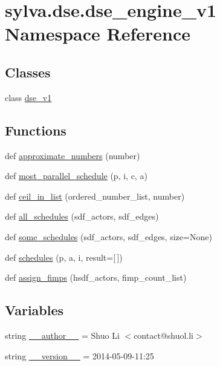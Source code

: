 \hypertarget{namespacesylva_1_1dse_1_1dse__engine__v1}{}\section{sylva.\+dse.\+dse\+\_\+engine\+\_\+v1 Namespace Reference}
\label{namespacesylva_1_1dse_1_1dse__engine__v1}
\subsection*{Classes}
\begin{DoxyCompactItemize}
\item 
class \hyperlink{classsylva_1_1dse_1_1dse__engine__v1_1_1dse__v1}{dse\+\_\+v1}
\end{DoxyCompactItemize}
\subsection*{Functions}
\begin{DoxyCompactItemize}
\item 
def \hyperlink{namespacesylva_1_1dse_1_1dse__engine__v1_ad6e97d4396aee376d84b0ce79ba7fd22}{approximate\+\_\+numbers} (number)
\item 
def \hyperlink{namespacesylva_1_1dse_1_1dse__engine__v1_a2c16f997588f8721ab7742ca16e79e64}{most\+\_\+parallel\+\_\+schedule} (p, i, c, a)
\item 
def \hyperlink{namespacesylva_1_1dse_1_1dse__engine__v1_af190117e4402a059bd348c6909abada2}{ceil\+\_\+in\+\_\+list} (ordered\+\_\+number\+\_\+list, number)
\item 
def \hyperlink{namespacesylva_1_1dse_1_1dse__engine__v1_a8ca06c203c74d5cd06866a67203d251c}{all\+\_\+schedules} (sdf\+\_\+actors, sdf\+\_\+edges)
\item 
def \hyperlink{namespacesylva_1_1dse_1_1dse__engine__v1_a4a316401cfa961e555596115afe86b4c}{some\+\_\+schedules} (sdf\+\_\+actors, sdf\+\_\+edges, size=None)
\item 
def \hyperlink{namespacesylva_1_1dse_1_1dse__engine__v1_a9f62832c5ef72269c1920b61d0eeb2a6}{schedules} (p, a, i, result=\mbox{[}$\,$\mbox{]})
\item 
def \hyperlink{namespacesylva_1_1dse_1_1dse__engine__v1_ac7bc9055c7171c3d5156f342722248fc}{assign\+\_\+fimps} (hsdf\+\_\+actors, fimp\+\_\+count\+\_\+list)
\end{DoxyCompactItemize}
\subsection*{Variables}
\begin{DoxyCompactItemize}
\item 
string \hyperlink{namespacesylva_1_1dse_1_1dse__engine__v1_a43b259fb54860365fe18c9efa8847022}{\+\_\+\+\_\+author\+\_\+\+\_\+} = \textquotesingle{}Shuo Li $<$contact@shuol.\+li$>$\textquotesingle{}
\item 
string \hyperlink{namespacesylva_1_1dse_1_1dse__engine__v1_ab8db6ab7e801f2f5d7907cd2a96584d2}{\+\_\+\+\_\+version\+\_\+\+\_\+} = \textquotesingle{}2014-\/05-\/09-\/11\+:25\textquotesingle{}
\end{DoxyCompactItemize}


